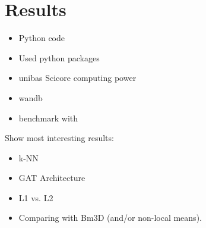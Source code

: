 \chapter{Results}
\label{sec:graphDenoising}

\begin{itemize}
  \item Python code
  \item Used python packages
  \item unibas Scicore computing power
  \item wandb\cite{wandb}
  \item benchmark with \cite{bm3d}
\end{itemize}


Show most interesting results:
\begin{itemize}
  \item k-NN
  \item GAT Architecture
  \item L1 vs. L2
  \item Comparing with Bm3D (and/or non-local means).
\end{itemize}

